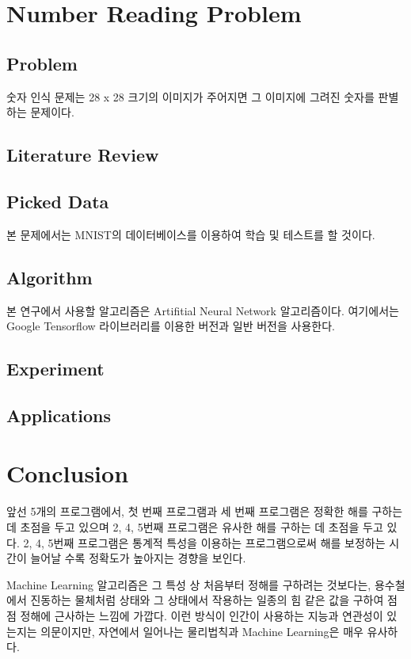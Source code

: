 \documentclass{sig-alternate-05-2015}
\begin{document}
\section{Number Reading Problem}
\begin{CJK}{UTF8}{mj}
\subsection{Problem}
숫자 인식 문제는 28 x 28 크기의 이미지가 주어지면 그 이미지에 그려진 숫자를 판별하는 문제이다.
\subsection{Literature Review}
\subsection{Picked Data}
본 문제에서는 MNIST의 데이터베이스를 이용하여 학습 및 테스트를 할 것이다.
\subsection{Algorithm}
본 연구에서 사용할 알고리즘은 Artifitial Neural Network 알고리즘이다. 여기에서는 Google Tensorflow 라이브러리를 이용한 버전과 일반 버전을 사용한다.
\subsection{Experiment}
\subsection{Applications}
\end{CJK}

\section{Conclusion}
\begin{CJK}{UTF8}{mj}
앞선 5개의 프로그램에서, 첫 번째 프로그램과 세 번째 프로그램은 정확한 해를 구하는 데 초점을 두고 있으며 2, 4, 5번째 프로그램은 유사한 해를 구하는 데 초점을 두고 있다. 2, 4, 5번째 프로그램은 통계적 특성을 이용하는 프로그램으로써 해를 보정하는 시간이 늘어날 수록 정확도가 높아지는 경향을 보인다.

Machine Learning 알고리즘은 그 특성 상 처음부터 정해를 구하려는 것보다는, 용수철에서 진동하는 물체처럼 상태와 그 상태에서 작용하는 일종의 힘 같은 값을 구하여 점점 정해에 근사하는 느낌에 가깝다. 이런 방식이 인간이 사용하는 지능과 연관성이 있는지는 의문이지만, 자연에서 일어나는 물리법칙과 Machine Learning은 매우 유사하다.
\end{CJK}
\end{document}
